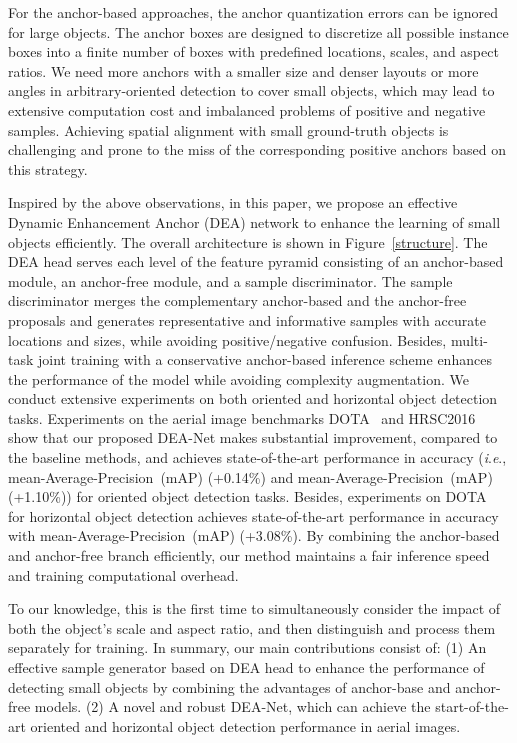 \documentclass[journal]{IEEEtran}
\newcommand{\ie}{\textit{i}.\textit{e}.}
\begin{document}
For the anchor-based approaches, the anchor quantization errors can be ignored for large objects. The anchor boxes are designed to discretize all possible instance boxes into a finite number of boxes with predefined locations, scales, and aspect ratios. We need more anchors with a smaller size and denser layouts or more angles in arbitrary-oriented detection to cover small objects, which may lead to extensive computation cost and imbalanced problems of positive and negative samples. Achieving spatial alignment with small ground-truth objects is challenging and prone to the miss of the corresponding positive anchors based on this strategy. 

Inspired by the above observations, in this paper, we propose an effective Dynamic Enhancement Anchor (DEA) network to enhance the learning of small objects efficiently. The overall architecture is shown in Figure~\ref{structure}. The DEA head serves each level of the feature pyramid consisting of an anchor-based module, an anchor-free module, and a sample discriminator. The sample discriminator merges the complementary anchor-based and the anchor-free proposals and generates representative and informative samples with accurate locations and sizes, while avoiding positive/negative confusion. Besides, multi-task joint training with a conservative anchor-based inference scheme enhances the performance of the model while avoiding complexity augmentation. We conduct extensive experiments on both oriented and horizontal object detection tasks. Experiments on the aerial image benchmarks DOTA~\cite{xia2018dota} and HRSC2016~\cite{lb2017high} show that our proposed DEA-Net makes substantial improvement, compared to the baseline methods, and achieves state-of-the-art performance in accuracy (\ie,  mean-Average-Precision~(mAP) (+0.14\%) and  mean-Average-Precision~(mAP) (+1.10\%)) for oriented object detection tasks. Besides, experiments on DOTA~\cite{xia2018dota} for horizontal object detection  achieves state-of-the-art performance in accuracy with  mean-Average-Precision~(mAP) (+3.08\%). By combining the anchor-based and anchor-free branch efficiently, our method maintains a fair inference speed and  training computational overhead. 

To our knowledge, this is the first time to simultaneously consider the impact of both the object’s scale and aspect ratio, and then distinguish and process them separately for training.
In summary, our main contributions consist of: (1) An  effective sample generator based on DEA head to enhance the performance of detecting small objects by combining the advantages of anchor-base and anchor-free models. (2) A novel and robust DEA-Net, which can achieve the start-of-the-art oriented and horizontal object detection performance in aerial images. 
\end{document}
